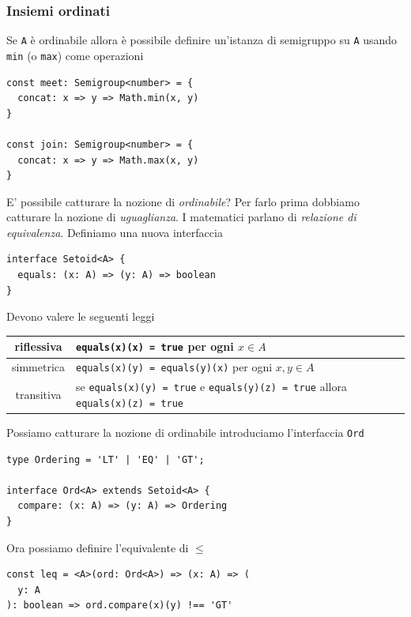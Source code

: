 \documentclass[12pt]{article}
\begin{document}
\subsubsection{Insiemi ordinati}

Se \texttt{A} è ordinabile allora è possibile definire un'istanza di semigruppo su \texttt{A} usando \texttt{min} (o \texttt{max}) come operazioni

\begin{verbatim}
const meet: Semigroup<number> = {
  concat: x => y => Math.min(x, y)
}

const join: Semigroup<number> = {
  concat: x => y => Math.max(x, y)
}
\end{verbatim}

E' possibile catturare la nozione di \emph{ordinabile}? Per farlo prima dobbiamo catturare la nozione di \emph{uguaglianza}.
I matematici parlano di \emph{relazione di equivalenza}.
Definiamo una nuova interfaccia

\begin{verbatim}
interface Setoid<A> {
  equals: (x: A) => (y: A) => boolean
}
\end{verbatim}

Devono valere le seguenti leggi

\begin{center}
\bgroup
\def\arraystretch{1.5}
\begin{tabular}{ |c|p{10cm}| }
\hline
riflessiva & \texttt{equals(x)(x) = true} per ogni $x \in A$ \\
\hline
simmetrica & \texttt{equals(x)(y) = equals(y)(x)} per ogni $x, y \in A$ \\
\hline
transitiva & se \texttt{equals(x)(y) = true} e \texttt{equals(y)(z) = true} allora \texttt{equals(x)(z) = true} \\
\hline
\end{tabular}
\egroup
\end{center}

Possiamo catturare la nozione di ordinabile introduciamo l'interfaccia \texttt{Ord}

\begin{verbatim}
type Ordering = 'LT' | 'EQ' | 'GT';

interface Ord<A> extends Setoid<A> {
  compare: (x: A) => (y: A) => Ordering
}
\end{verbatim}

Ora possiamo definire l'equivalente di $\leq$

\begin{verbatim}
const leq = <A>(ord: Ord<A>) => (x: A) => (
  y: A
): boolean => ord.compare(x)(y) !== 'GT'
\end{verbatim}
\end{document}
